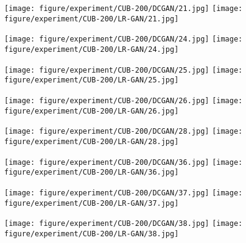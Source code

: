 \documentclass{article} \usepackage{iclr2017_conference,times}
\begin{document}
\begin{figure}[b]
\begin{minipage}{0.12\linewidth}
\texttt{[image: figure/experiment/CUB-200/DCGAN/21.jpg]}
\texttt{[image: figure/experiment/CUB-200/LR-GAN/21.jpg]}
\vspace{0.05cm}
\end{minipage}
\begin{minipage}{0.12\linewidth}
\texttt{[image: figure/experiment/CUB-200/DCGAN/24.jpg]}
\texttt{[image: figure/experiment/CUB-200/LR-GAN/24.jpg]}
\vspace{0.05cm}
\end{minipage}
\begin{minipage}{0.12\linewidth}
\texttt{[image: figure/experiment/CUB-200/DCGAN/25.jpg]}
\texttt{[image: figure/experiment/CUB-200/LR-GAN/25.jpg]}
\vspace{0.05cm}
\end{minipage}
\begin{minipage}{0.12\linewidth}
\texttt{[image: figure/experiment/CUB-200/DCGAN/26.jpg]}
\texttt{[image: figure/experiment/CUB-200/LR-GAN/26.jpg]}
\vspace{0.05cm}
\end{minipage}
\begin{minipage}{0.12\linewidth}
\texttt{[image: figure/experiment/CUB-200/DCGAN/28.jpg]}
\texttt{[image: figure/experiment/CUB-200/LR-GAN/28.jpg]}
\vspace{0.05cm}
\end{minipage}
\begin{minipage}{0.12\linewidth}
\texttt{[image: figure/experiment/CUB-200/DCGAN/36.jpg]}
\texttt{[image: figure/experiment/CUB-200/LR-GAN/36.jpg]}
\vspace{0.05cm}
\end{minipage}
\begin{minipage}{0.12\linewidth}
\texttt{[image: figure/experiment/CUB-200/DCGAN/37.jpg]}
\texttt{[image: figure/experiment/CUB-200/LR-GAN/37.jpg]}
\vspace{0.05cm}
\end{minipage}
\begin{minipage}{0.12\linewidth}
\texttt{[image: figure/experiment/CUB-200/DCGAN/38.jpg]}
\texttt{[image: figure/experiment/CUB-200/LR-GAN/38.jpg]}
\vspace{0.05cm}
\end{minipage}


\end{figure}
\end{document}

